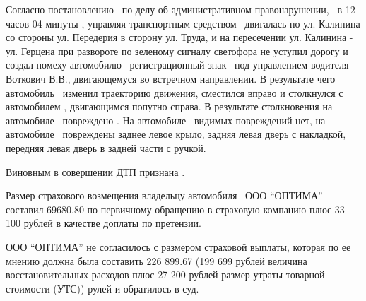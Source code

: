 	Согласно постановлению  \, по делу об административном правонарушении,  \,  в 12 часов 04 минуты ,  управляя транспортным средством  \, двигалась по ул. Калинина со стороны ул. Передерия в сторону ул. Труда, и на пересечении ул. Калинина - ул. Герцена при развороте по зеленому сигналу светофора не уступил дорогу и создал помеху автомобилю  \, регистрационный знак  \, под управлением водителя Воткович В.В., двигающемуся во встречном направлении. В результате чего автомобиль  \, изменил траекторию движения, сместился вправо и столкнулся с автомобилем \tcb, двигающимся попутно справа. В результате столкновения на автомобиле  \, повреждено .
	На автомобиле  \, видимых повреждений нет, на автомобиле  \, повреждены заднее левое крыло, задняя левая дверь с накладкой, передняя левая дверь в задней части с ручкой.
	
	Виновным в совершении ДТП признана  .
	
	Размер страхового возмещения  владельцу автомобиля  \, ООО \enquote{ОПТИМА} составил 69680.80 по первичному обращению в страховую компанию плюс 33 100 рублей в качестве доплаты по претензии.
	
	ООО \enquote{ОПТИМА} не согласилось с размером страховой выплаты, которая по ее мнению должна была составить 226 899.67 (199 699 рублей величина восстановительных расходов плюс 27 200 рублей размер утраты товарной стоимости (УТС)) рулей и обратилось в суд.
	
	

